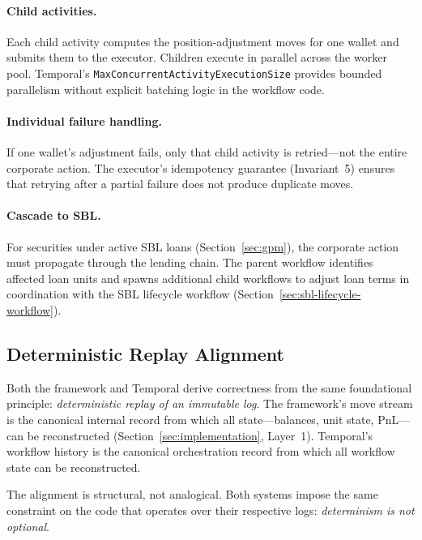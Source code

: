 \documentclass[11pt,a4paper]{article}
\begin{document}
\paragraph{Child activities.}
Each child activity computes the position-adjustment moves for one wallet and submits them to the executor. Children execute in parallel across the worker pool. Temporal's \texttt{MaxConcurrentActivityExecutionSize} provides bounded parallelism without explicit batching logic in the workflow code.

\paragraph{Individual failure handling.}
If one wallet's adjustment fails, only that child activity is retried---not the entire corporate action. The executor's idempotency guarantee (Invariant~5) ensures that retrying after a partial failure does not produce duplicate moves.

\paragraph{Cascade to SBL.}
For securities under active SBL loans (Section~\ref{sec:gpm}), the corporate action must propagate through the lending chain. The parent workflow identifies affected loan units and spawns additional child workflows to adjust loan terms in coordination with the SBL lifecycle workflow (Section~\ref{sec:sbl-lifecycle-workflow}).

\subsection{Deterministic Replay Alignment}
\label{sec:temporal-replay-alignment}

Both the framework and Temporal derive correctness from the same foundational principle: \emph{deterministic replay of an immutable log}. The framework's move stream is the canonical internal record from which all state---balances, unit state, PnL---can be reconstructed (Section~\ref{sec:implementation}, Layer~1). Temporal's workflow history is the canonical orchestration record from which all workflow state can be reconstructed.

The alignment is structural, not analogical. Both systems impose the same constraint on the code that operates over their respective logs: \emph{determinism is not optional}.
\end{document}
